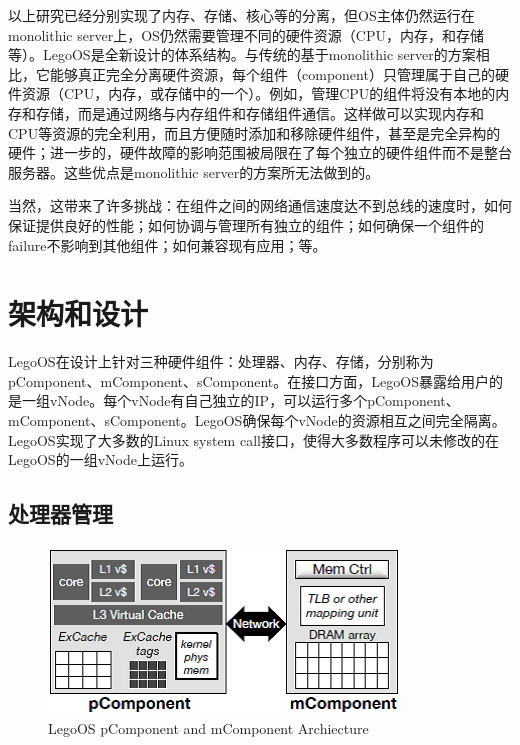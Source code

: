 以上研究已经分别实现了内存、存储、核心等的分离，但OS主体仍然运行在monolithic server上，OS仍然需要管理不同的硬件资源（CPU，内存，和存储等）。LegoOS是全新设计的体系结构。与传统的基于monolithic server的方案相比，它能够真正完全分离硬件资源，每个组件（component）只管理属于自己的硬件资源（CPU，内存，或存储中的一个）。例如，管理CPU的组件将没有本地的内存和存储，而是通过网络与内存组件和存储组件通信。这样做可以实现内存和CPU等资源的完全利用，而且方便随时添加和移除硬件组件，甚至是完全异构的硬件；进一步的，硬件故障的影响范围被局限在了每个独立的硬件组件而不是整台服务器。这些优点是monolithic server的方案所无法做到的。

当然，这带来了许多挑战：在组件之间的网络通信速度达不到总线的速度时，如何保证提供良好的性能；如何协调与管理所有独立的组件；如何确保一个组件的failure不影响到其他组件；如何兼容现有应用；等。


\section{架构和设计}

LegoOS在设计上针对三种硬件组件：处理器、内存、存储，分别称为pComponent、mComponent、sComponent。在接口方面，LegoOS暴露给用户的是一组vNode。每个vNode有自己独立的IP，可以运行多个pComponent、mComponent、sComponent。LegoOS确保每个vNode的资源相互之间完全隔离。LegoOS实现了大多数的Linux system call接口，使得大多数程序可以未修改的在LegoOS的一组vNode上运行。

\subsection{处理器管理}

\begin{figure}[h]
\centering
\includegraphics[scale=1.00]{Figures/legoos/1.png}
\decoRule
\caption{LegoOS pComponent and mComponent Archiecture}
\label{fig:legoos_archiecture}
\end{figure}

